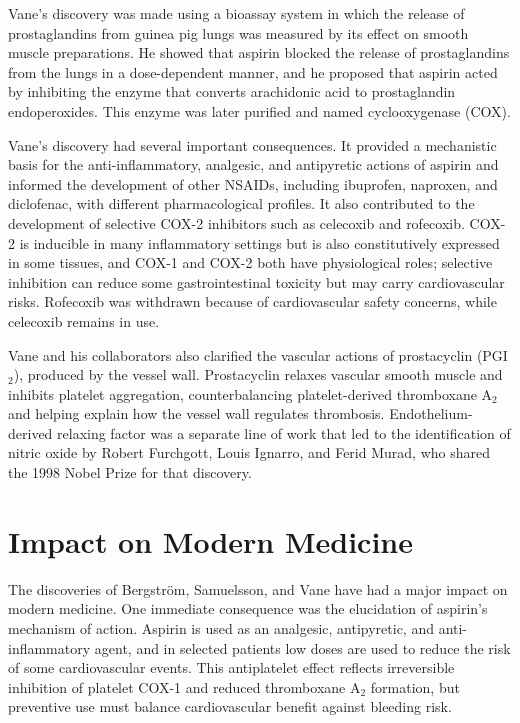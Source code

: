 Vane's discovery was made using a bioassay system in which the release of prostaglandins from guinea pig lungs was measured by its effect on smooth muscle preparations. He showed that aspirin blocked the release of prostaglandins from the lungs in a dose-dependent manner, and he proposed that aspirin acted by inhibiting the enzyme that converts arachidonic acid to prostaglandin endoperoxides. This enzyme was later purified and named cyclooxygenase (COX).

Vane's discovery had several important consequences. It provided a mechanistic basis for the anti-inflammatory, analgesic, and antipyretic actions of aspirin and informed the development of other NSAIDs, including ibuprofen, naproxen, and diclofenac, with different pharmacological profiles. It also contributed to the development of selective COX-2 inhibitors such as celecoxib and rofecoxib. COX-2 is inducible in many inflammatory settings but is also constitutively expressed in some tissues, and COX-1 and COX-2 both have physiological roles; selective inhibition can reduce some gastrointestinal toxicity but may carry cardiovascular risks. Rofecoxib was withdrawn because of cardiovascular safety concerns, while celecoxib remains in use.

Vane and his collaborators also clarified the vascular actions of prostacyclin (PGI$_2$), produced by the vessel wall. Prostacyclin relaxes vascular smooth muscle and inhibits platelet aggregation, counterbalancing platelet-derived thromboxane A$_2$ and helping explain how the vessel wall regulates thrombosis. Endothelium-derived relaxing factor was a separate line of work that led to the identification of nitric oxide by Robert Furchgott, Louis Ignarro, and Ferid Murad, who shared the 1998 Nobel Prize for that discovery.

\section{Impact on Modern Medicine}

The discoveries of Bergstr\"om, Samuelsson, and Vane have had a major impact on modern medicine. One immediate consequence was the elucidation of aspirin's mechanism of action. Aspirin is used as an analgesic, antipyretic, and anti-inflammatory agent, and in selected patients low doses are used to reduce the risk of some cardiovascular events. This antiplatelet effect reflects irreversible inhibition of platelet COX-1 and reduced thromboxane A$_2$ formation, but preventive use must balance cardiovascular benefit against bleeding risk.

